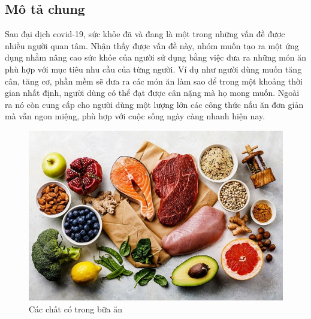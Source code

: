 \subsection{Mô tả chung}
    \quad Sau đại dịch covid-19, sức khỏe đã và đang là một trong những vấn đề được nhiều người quan tâm. Nhận thấy được vấn đề này, nhóm muốn tạo ra một ứng dụng nhằm nâng cao sức khỏe của người sử dụng bằng việc đưa ra những món ăn phù hợp với mục tiêu nhu cầu của từng người. Ví dụ như người dùng muốn tăng cân, tăng cơ, phần mềm sẽ đưa ra các món ăn làm sao để trong một khoảng thời gian nhất định, người dùng có thể đạt được cân nặng mà họ mong muốn. Ngoài ra nó còn cung cấp cho người dùng một lượng lớn các công thức nấu ăn đơn giản mà vẫn ngon miệng, phù hợp với cuộc sống ngày càng nhanh hiện nay.\\
    
    \begin{figure}[h]
        \centering
        \includegraphics[width=0.7\linewidth]{images/healthy-food.jpg}
        \caption{Các chất có trong bữa ăn}
    \end{figure}